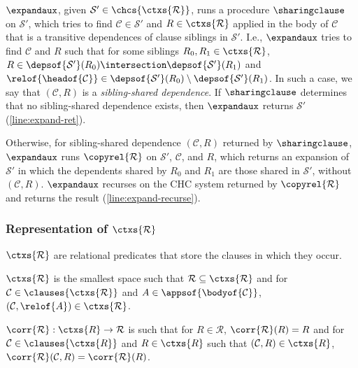 $\expandaux$, given $\mathcal{S}' \in \chcs{ \ctxs{ \mathcal{R} } }$,
runs a procedure $\sharingclause$ on $\mathcal{S}'$, which tries to
find $\mathcal{C} \in \mathcal{S}'$ and $R \in \ctxs{ \mathcal{R} }$
applied in the body of $\mathcal{C}$ that is a transitive dependences of
clause siblings in $\mathcal{S}'$.
%
I.e., $\expandaux$ tries to find $\mathcal{C}$ and $R$ such that for
some siblings $R_0, R_1 \in \ctxs{ \mathcal{R} }$, $R \in \depsof{
  \mathcal{S}' }(R_0) \intersection \depsof{ \mathcal{S}' }(R_1)$ and
$\relof{ \headof{ \mathcal{C} }} \in \depsof{ \mathcal{S}' }(R_0)
\setminus \depsof{ \mathcal{S}' }(R_1)$.
%
In such a case, we say that $(\mathcal{C}, R)$ is a
\emph{sibling-shared dependence}.
If $\sharingclause$ determines that no sibling-shared dependence
exists, then $\expandaux$ returns $\mathcal{S}'$
(\autoref{line:expand-ret}).

Otherwise, for sibling-shared dependence $(\mathcal{C}, R)$ returned
by $\sharingclause$, $\expandaux$ runs $\copyrel{ \mathcal{R} }$ on
$\mathcal{S}'$, $\mathcal{C}$, and $R$, which returns an expansion of
$\mathcal{S}'$ in which the dependents shared by $R_0$ and $R_1$ are
those shared in $\mathcal{S}'$, without $(\mathcal{C}, R)$.
%
$\expandaux$ recurses on the CHC system returned by $\copyrel{
  \mathcal{R} }$ and returns the result
(\autoref{line:expand-recurse}).

\subsubsection{Representation of $\ctxs{ \mathcal{R} }$}
%
$\ctxs{ \mathcal{R} }$ are relational predicates that store the
clauses in which they occur.
%
\begin{defn}
  \label{defn:ctxs}
  $\ctxs{ \mathcal{R} }$ is the smallest space such that $\mathcal{R}
  \subseteq \ctxs{ \mathcal{R} }$ and for $\mathcal{C} \in \clauses{
    \mathcal{ \ctxs{R} } }$ and $A \in \appsof{ \bodyof{ \mathcal{C} }
  }$, $(\mathcal{C}, \relof{A}) \in \ctxs{ \mathcal{R} }$.
\end{defn}
$\corr{ \mathcal{R} } : \ctxs{R} \to \mathcal{R}$ is such that for $R
\in \mathcal{R}$, $\corr{ \mathcal{R} }(R) = R$ and for $\mathcal{C}
\in \clauses{ \ctxs{R} }$ and $R \in \ctxs{R}$ such that
$(\mathcal{C}, R) \in \ctxs{R}$, $\corr{\mathcal{R}}(\mathcal{C}, R) =
\corr{ \mathcal{R} }(R)$.

